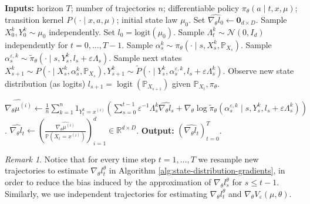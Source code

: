 \documentclass[11pt]{article}
\numberwithin{equation}{section}
\theoremstyle{definition}
\theoremstyle{remark}
\newtheorem{remark}{Remark}[section]
\def\eps{\varepsilon}
\def\R{{\mathbb R}}
\DeclareMathOperator*{\logit}{logit}
\begin{document}
\begin{algorithm}[H]
\caption{State Distribution Gradient Estimation}
\label{alg:state-distribution-gradients}
\begin{algorithmic}[2]
\State \textbf{Inputs:} horizon $T$; number of trajectories $n$; differentiable policy $\pi_\theta(a\mid t,x,\mu)$; transition kernel $P(\cdot\mid x,a,\mu)$; initial state law $\mu_0$.
\State Set $\widehat{\nabla_\theta l_0} \gets \mathbf{0}_{d \times D}$.
    \State Sample $X_0^k,Y_0^k \sim \mu_0$ independently.
    \State Set $l_0 = \mathrm{logit}(\mu_0)$.
    \State Sample $\Lambda_t^k \sim \mathcal N(0,I_d)$ independently for $t = 0, \ldots, T-1$.
     
        \State Sample $\alpha_s^k \sim \pi_\theta(\cdot \mid s,X_s^k,\mathbb P_{X_s})$.
        \State Sample $\alpha^{\eps,k}_s \sim \tilde \pi_\theta(\cdot \mid s,Y_s^k, l_s + \eps \Lambda_s)$.
        \State Sample next states $X_{s+1}^k \sim P(\cdot \mid X_s^k, \alpha_s^k, \mathbb P_{X_s}), Y_{s + 1}^k \sim \tilde P(\cdot \mid Y_s^k, \alpha_s^{\eps,k}, l_s + \eps \Lambda_s^k)$.
        \State Observe new state distribution (as logits) $l_{s + 1} = \logit (\mathbb P_{X_{s + 1}})$ given $\mathbb P_{X_t}, \pi_\theta$.
    \EndFor
\EndFor

        \State $\widehat{\nabla_{\theta} \mu^{(i)}} \gets \displaystyle \frac{1}{n}\sum_{k = 1}^n 1_{Y^k_t = x^{(i)}} 
        \left( \sum_{s = 0}^{t-1}  \eps^{-1} \Lambda_s^k \widehat{\nabla_\theta l_s}  + \nabla_\theta \log \tilde \pi_\theta(\alpha_s^{\eps,k} \mid s,Y_s^k, l_s + \eps \Lambda^k_s) \right)  $.
    \EndFor
    \State $\widehat{\nabla_\theta l_t} \gets \displaystyle \left(\frac{\widehat{\nabla_{\theta} \mu^{(i)}}}{\mathbb P (X_t = x^{(i)})}\right)_{i = 1}^{d} \in \R^{d \times D}$.
\EndFor
\State \textbf{Output:} $\left(\widehat{\nabla_\theta l_t}\right)_{t=0}^{T}$.
\end{algorithmic}
\end{algorithm}

\begin{remark}
    Notice that for every time step $t=1, \ldots, T$ we resample new trajectories to estimate $\nabla_\theta l_t^\theta$ in Algorithm \ref{alg:state-distribution-gradients},
     in order to reduce the bias induced by the approximation of $\nabla_\theta l_s^\theta$ for $s \leq t-1$. 
    Similarly, we use independent trajectories for estimating $\nabla_\theta l_t^\theta$ and $\nabla_\theta V_{\eps}(\mu, \theta)$.
\end{remark}
\end{document}
